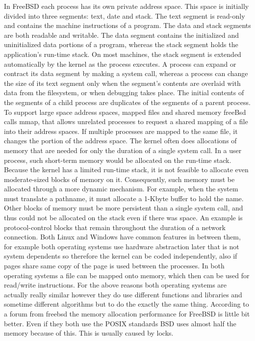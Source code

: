 \documentclass[letterpaper,10pt,draftclsnofoot,onecolumn]{IEEEtran}
\begin{document}
In FreeBSD each process has its own private address space. This space is initially divided into three segments: text, date and stack. The text segment is read-only and contains the machine instructions of a program. The data and stack segments are both readable and writable. The data segment contains the initialized and uninitialized data portions of a program, whereas the stack segment holds the application's run-time stack. On most machines, the stack segment is extended automatically by the kernel as the process executes. A process can expand or contract its data segment by making a system call, whereas a process can change the size of its text segment only when the segment's contents are overlaid with data from the filesystem, or when debugging takes place. The initial contents of the segments of a child process are duplicates of the segments of a parent process.
To support large space address spaces, mapped files and shared memory freeBsd calls mmap, that allows unrelated processes to request a shared mapping of a file into their address spaces. If multiple processes are mapped to the same file, it changes the portion of the address space.
The kernel often does allocations of memory that are needed for only the duration of a single system call. In a user process, such short-term memory would be allocated on the run-time stack. Because the kernel has a limited run-time stack, it is not feasible to allocate even moderate-sized blocks of memory on it. Consequently, such memory must be allocated through a more dynamic mechanism. For example, when the system must translate a pathname, it must allocate a 1-Kbyte buffer to hold the name. Other blocks of memory must be more persistent than a single system call, and thus could not be allocated on the stack even if there was space. An example is protocol-control blocks that remain throughout the duration of a network connection.\cite{[2]}
Both Linux and Windows have common features in between them, for example both operating systems use hardware abstraction later that is not system dependents so therefore the kernel can be coded independently, also if pages share same copy of the page is used between the processes. In both operating systems a file can be mapped onto memory, which then can be used for read/write instructions. For the above reasons both operating systems are actually really similar however they do use different functions and libraries and sometime different algorithms but to do the exactly the same thing. According to a forum from freebsd the memory allocation performance for FreeBSD is little bit better. Even if they both use the POSIX standards BSD uses almost half the memory because of this. This is usually caused by locks.
\end{document}
